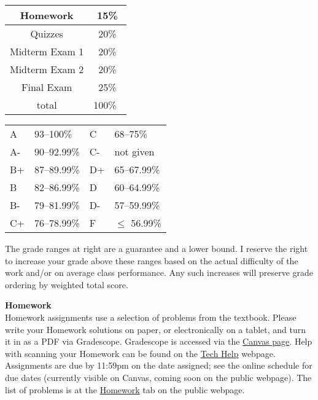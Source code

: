 \documentclass[12pt]{article}
\renewcommand{\emph}[1]{\textsf{\textbf{#1}}}
\newcommand{\localhead}[1]{\par\smallskip\textbf{#1} \smallskip\nobreak\\}%
\def\heading#1{\localhead{\large\emph{#1}}}
\begin{document}
\begin{multicols}{2}
\begin{tabular}{|c|c|}
\hline
Homework & 15\% \\
\hline
Quizzes & 20\% \\
\hline
Midterm Exam 1 & 20\% \\
\hline
Midterm Exam 2 & 20\%  \\
\hline
Final Exam & 25\% \\
\hline
total & 100\% \, \\
\hline
\end{tabular}


\begin{tabular}{llll}
A  & 93--100\%& C  & 68--75\%  \\
A- & 90--92.99\% & C- & not given \\
B+ & 87--89.99\% & D+ & 65--67.99\%  \\
B  & 82--86.99\% & D  & 60--64.99\%  \\
B- & 79--81.99\% & D- & 57--59.99\%  \\
C+ & 76--78.99\% & F  & $\le$ 56.99\%
\end{tabular}
\end{multicols}

The grade ranges at right are a guarantee and a lower bound. I reserve
the right to increase your grade above these ranges based on the
actual difficulty of the work and/or on average class performance.
Any such increases will preserve grade ordering by weighted total
score.





\heading{Homework}
Homework assignments use a selection of problems from the textbook.
Please write your Homework solutions on paper, or electronically on a
tablet, and turn it in as a PDF via Gradescope.  Gradescope is
accessed via the \href{https://canvas.alaska.edu/courses/21592}{Canvas
page}.  Help with scanning your Homework can be found on the
\href{https://uaf-math251.github.io/calc2/techHelp.html}{Tech Help}
webpage.  Assignments are due by 11:59pm on the date assigned; see the
online 
schedule
for due dates (currently visible on Canvas, coming soon on the public webpage).  The list of problems is at the
\href{https://uaf-math251.github.io/calc2/homework.html}{Homework} tab
on the public webpage.
\end{document}
